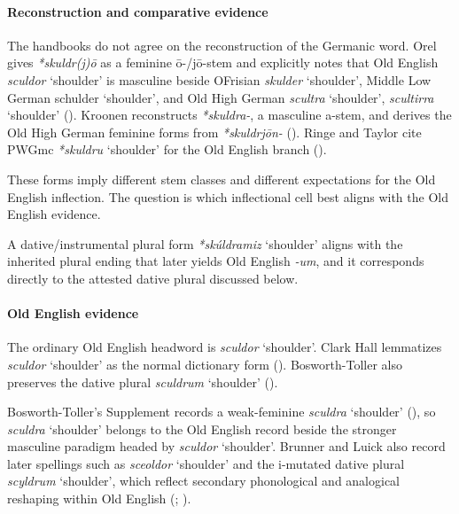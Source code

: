 \documentclass[
  british,
  a4paper,
]{article}
\providecommand{\Recon}[1]{\emph{*#1}}
\begin{document}
\paragraph{Reconstruction and comparative
evidence}\label{reconstruction-and-comparative-evidence-130}

The handbooks do not agree on the reconstruction of the Germanic word.
Orel gives \emph{*skuldr(j)ō} as a feminine ō-/jō-stem and explicitly
notes that Old English {\emph{sculdor}} `shoulder' is masculine beside
OFrisian {\emph{skulder}} `shoulder', Middle Low German {schulder}
`shoulder', and Old High German {\emph{scultra}} `shoulder',
{\emph{scultirra}} `shoulder' ().
Kroonen reconstructs {\emph{*skuldra-}}, a masculine a-stem, and derives
the Old High German feminine forms from {\emph{*skuldrjōn-}}
(). Ringe and Taylor cite
PWGmc \Recon{skuldru} `shoulder' for the Old English branch
().

These forms imply different stem classes and different expectations for
the Old English inflection. The question is which inflectional cell best
aligns with the Old English evidence.

A dative/instrumental plural form \Recon{skúldramiz} `shoulder' aligns
with the inherited plural ending that later yields Old English
\emph{-um}, and it corresponds directly to the attested dative plural
discussed below.

\paragraph{Old English evidence}\label{old-english-evidence-130}

The ordinary Old English headword is {\emph{sculdor}} `shoulder'. Clark
Hall lemmatizes {\emph{sculdor}} `shoulder' as the normal dictionary
form ().
Bosworth-Toller also preserves the dative plural {\emph{sculdrum}}
`shoulder' ().

Bosworth-Toller's Supplement records a weak-feminine {\emph{sculdra}}
`shoulder' (), so {\emph{sculdra}} `shoulder' belongs to the Old English record
beside the stronger masculine paradigm headed by {\emph{sculdor}}
`shoulder'. Brunner and Luick also record later spellings such as
{\emph{sceoldor}} `shoulder' and the i-mutated dative plural
{\emph{scyldrum}} `shoulder', which reflect secondary phonological and
analogical reshaping within Old English
(;
).
\end{document}
